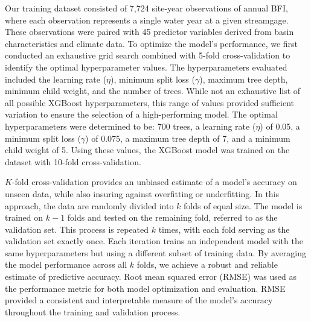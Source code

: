 \documentclass[
  authoryear,
  preprint,
  1p,
  onecolumn]{elsarticle}
\begin{document}
Our training dataset consisted of 7,724 site-year observations of annual
BFI, where each observation represents a single water year at a given
streamgage. These observations were paired with 45 predictor variables
derived from basin characteristics and climate data. To optimize the
model's performance, we first conducted an exhaustive grid search
combined with 5-fold cross-validation to identify the optimal
hyperparameter values. The hyperparameters evaluated included the
learning rate (\(\eta\)), minimum split loss (\(\gamma\)), maximum tree
depth, minimum child weight, and the number of trees. While not an
exhaustive list of all possible XGBoost hyperparameters, this range of
values provided sufficient variation to ensure the selection of a
high-performing model. The optimal hyperparameters were determined to
be: 700 trees, a learning rate (\(\eta\)) of 0.05, a minimum split loss
(\(\gamma\)) of 0.075, a maximum tree depth of 7, and a minimum child
weight of 5. Using these values, the XGBoost model was trained on the
dataset with 10-fold cross-validation.

\(K\)-fold cross-validation provides an unbiased estimate of a model's
accuracy on unseen data, while also insuring against overfitting or
underfitting. In this approach, the data are randomly divided into \(k\)
folds of equal size. The model is trained on \(k-1\) folds and tested on
the remaining fold, referred to as the validation set. This process is
repeated \(k\) times, with each fold serving as the validation set
exactly once. Each iteration trains an independent model with the same
hyperparameters but using a different subset of training data. By
averaging the model performance across all \(k\) folds, we achieve a
robust and reliable estimate of predictive accuracy. Root mean squared
error (RMSE) was used as the performance metric for both model
optimization and evaluation. RMSE provided a consistent and
interpretable measure of the model's accuracy throughout the training
and validation process.
\end{document}
